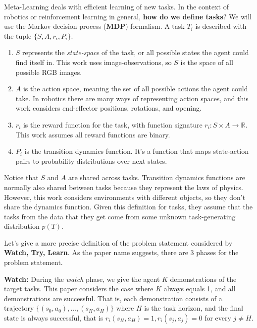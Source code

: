 \documentclass[
  letterpaper,
  numbers=noenddot,
  DIV=11]{scrreprt}
\theoremstyle{definition}
\theoremstyle{plain}
\theoremstyle{plain}
\theoremstyle{remark}
\begin{document}
Meta-Learning deals with efficient learning of new tasks. In the context
of robotics or reinforcement learning in general, \textbf{how do we
define tasks}? We will use the Markov decision process (\textbf{MDP})
formalism. A task \(T_i\) is described with the tuple
\(\{S, A, r_i, P_i\}\).

\begin{enumerate}
\def\labelenumi{\arabic{enumi}.}
\item
  \(S\) represents the \emph{state-space} of the task, or all possible
  states the agent could find itself in. This work uses
  image-observations, so \(S\) is the space of all possible RGB images.
\item
  \(A\) is the action space, meaning the set of all possible actions the
  agent could take. In robotics there are many ways of representing
  action spaces, and this work considers end-effector positions,
  rotations, and opening.
\item
  \(r_i\) is the reward function for the task, with function signature
  \(r_i : S \times A \to \mathbb{R}\). This work assumes all reward
  functions are binary.
\item
  \(P_i\) is the transition dynamics function. It's a function that maps
  state-action pairs to probability distributions over next states.
\end{enumerate}

Notice that \(S\) and \(A\) are shared across tasks. Transition dynamics
functions are normally also shared between tasks because they represent
the laws of physics. However, this work considers environments with
different objects, so they don't share the dynamics function. Given this
definition for tasks, they assume that the tasks from the data that they
get come from some unknown task-generating distribution \(p(T)\).

Let's give a more precise definition of the problem statement considered
by \textbf{Watch, Try, Learn}. As the paper name suggests, there are 3
phases for the problem statement.

\textbf{Watch:} During the \emph{watch} phase, we give the agent \(K\)
demonstrations of the target tasks. This paper considers the case where
\(K\) always equals 1, and all demonstrations are successful. That is,
each demonstration consists of a trajectory
\(\{(s_0, a_0), \ldots, (s_H, a_H)\}\) where \(H\) is the task horizon,
and the final state is always successful, that is
\(r_i(s_H, a_H) = 1, r_i(s_j, a_j) = 0\) for every \(j \neq H\).
\end{document}
